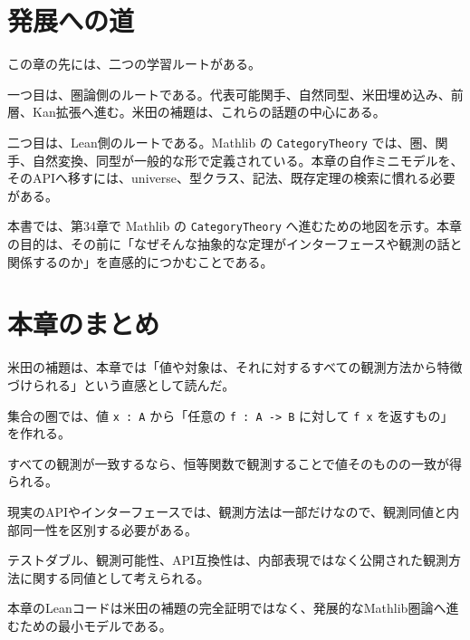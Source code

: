 \section{発展への道}

この章の先には、二つの学習ルートがある。

一つ目は、圏論側のルートである。代表可能関手、自然同型、米田埋め込み、前層、Kan拡張へ進む。米田の補題は、これらの話題の中心にある。

二つ目は、Lean側のルートである。Mathlib の \texttt{CategoryTheory} では、圏、関手、自然変換、同型が一般的な形で定義されている。本章の自作ミニモデルを、そのAPIへ移すには、universe、型クラス、記法、既存定理の検索に慣れる必要がある。

本書では、第34章で Mathlib の \texttt{CategoryTheory} へ進むための地図を示す。本章の目的は、その前に「なぜそんな抽象的な定理がインターフェースや観測の話と関係するのか」を直感的につかむことである。

\section{本章のまとめ}

米田の補題は、本章では「値や対象は、それに対するすべての観測方法から特徴づけられる」という直感として読んだ。

集合の圏では、値 \texttt{x : A} から「任意の \texttt{f : A -> B} に対して \texttt{f x} を返すもの」を作れる。

すべての観測が一致するなら、恒等関数で観測することで値そのものの一致が得られる。

現実のAPIやインターフェースでは、観測方法は一部だけなので、観測同値と内部同一性を区別する必要がある。

テストダブル、観測可能性、API互換性は、内部表現ではなく公開された観測方法に関する同値として考えられる。

本章のLeanコードは米田の補題の完全証明ではなく、発展的なMathlib圏論へ進むための最小モデルである。

